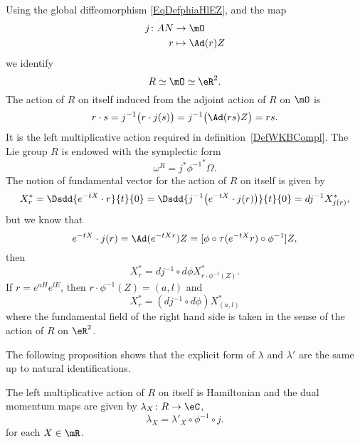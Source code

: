 Using the global diffeomorphism \eqref{EqDefphiaHlEZ}, and the map
\begin{equation}
	\begin{aligned}
		j\colon AN & \to \mO         \\
		r          & \mapsto \Ad(r)Z
	\end{aligned}
\end{equation}
we identify
\[
	R\simeq\mO\simeq\eR^2.
\]
The action of $R$ on itself induced from the adjoint action of $R$ on $\mO$ is
\[
	r\cdot s=j^{-1}\big( r\cdot j(s) \big)=j^{-1}\big( \Ad(rs)Z \big)=rs.
\]
It is the left multiplicative action required in definition~\ref{DefWKBCompl}. The Lie group $R$ is endowed with the symplectic form
\[
	\omega^R=j^*{\phi^{-1}}^*\Omega.
\]
The notion of fundamental vector for the action of $R$ on itself is given by
\begin{equation}
	X^*_r=\Dsdd{e^{-tX}\cdot r}{t}{0}
	=\Dsdd{ j^{-1}\big( e^{-tX}\cdot j(r) \big) }{t}{0}
	=dj^{-1} X^*_{j(r)},
\end{equation}
but we know that
\[
	e^{-tX}\cdot j(r)=\Ad(e^{-tX r})Z=[\phi\circ \tau(e^{-tX}r)\circ \phi^{-1}]Z,
\]
then
\[
	X^*_r=dj^{-1}\circ d\phi X^*_{r\cdot \phi^{-1}(Z)}.
\]
If $r=e^{aH}e^{lE}$, then $r\cdot \phi^{-1}(Z)=(a,l)$ and
\begin{equation}
	X^*_r=(dj^{-1}\circ d\phi) X^*_{(a,l)}
\end{equation}
where the fundamental field of the right hand side is taken in the sense of the action of $R$ on $\eR^2$.

The following proposition shows that the explicit form of $\lambda$ and $\lambda'$ are the same up to natural identifications.

\begin{proposition}
	The left multiplicative action of $R$ on itself is Hamiltonian and the dual momentum maps are given by  $\lambda_X\colon R\to \eC$,
	\begin{equation}
		\lambda_X= \lambda'_X\circ\phi^{-1}\circ j.
	\end{equation}
	for each $X\in\mR$.
	\label{PropMomslR}
\end{proposition}

